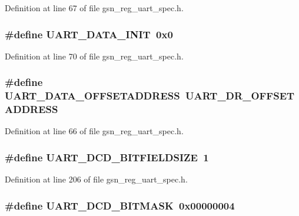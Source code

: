 Definition at line 67 of file gsn\_\-reg\_\-uart\_\-spec.h.

\hypertarget{a00575_a4b3fca5fdbe8bc1d69e2e1dbde549e19}{
\subsubsection[{UART\_\-DATA\_\-INIT}]{\setlength{\rightskip}{0pt plus 5cm}\#define UART\_\-DATA\_\-INIT~0x0}}
\label{a00575_a4b3fca5fdbe8bc1d69e2e1dbde549e19}


Definition at line 70 of file gsn\_\-reg\_\-uart\_\-spec.h.

\hypertarget{a00575_a0b89ab17c85fe138063876efa33565c2}{
\subsubsection[{UART\_\-DATA\_\-OFFSETADDRESS}]{\setlength{\rightskip}{0pt plus 5cm}\#define UART\_\-DATA\_\-OFFSETADDRESS~UART\_\-DR\_\-OFFSETADDRESS}}
\label{a00575_a0b89ab17c85fe138063876efa33565c2}


Definition at line 66 of file gsn\_\-reg\_\-uart\_\-spec.h.

\hypertarget{a00575_adbc5d843846c01d1321d2446f98979ed}{
\subsubsection[{UART\_\-DCD\_\-BITFIELDSIZE}]{\setlength{\rightskip}{0pt plus 5cm}\#define UART\_\-DCD\_\-BITFIELDSIZE~1}}
\label{a00575_adbc5d843846c01d1321d2446f98979ed}


Definition at line 206 of file gsn\_\-reg\_\-uart\_\-spec.h.

\hypertarget{a00575_a26dbf2f99dcdbc3087788fd7bb43714b}{
\subsubsection[{UART\_\-DCD\_\-BITMASK}]{\setlength{\rightskip}{0pt plus 5cm}\#define UART\_\-DCD\_\-BITMASK~0x00000004}}
\label{a00575_a26dbf2f99dcdbc3087788fd7bb43714b}


